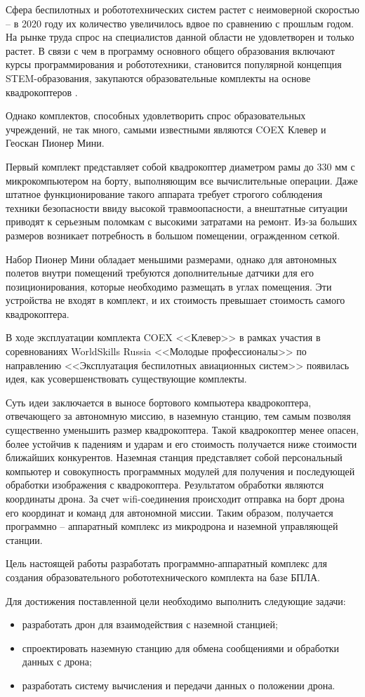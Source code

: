 Сфера беспилотных и робототехнических систем растет с неимоверной скоростью -- в 2020 году их количество увеличилось вдвое по сравнению с прошлым годом. На рынке труда спрос на специалистов данной области не удовлетворен и только растет. В связи с чем в программу основного общего образования включают курсы программирования и робототехники, становится популярной концепция STEM-образования, закупаются образовательные комплекты на основе квадрокоптеров \cite{minobr}.

Однако комплектов, способных удовлетворить спрос образовательных учреждений, не так много, самыми известными являются COEX Клевер и Геоскан Пионер Мини.

Первый комплект представляет собой квадрокоптер диаметром рамы до 330 мм с микрокомпьютером на борту, выполняющим все вычислительные операции. Даже штатное функционирование такого аппарата требует строгого соблюдения техники безопасности ввиду высокой травмоопасности, а внештатные ситуации приводят к серьезным поломкам с высокими затратами на ремонт. Из-за больших размеров возникает потребность в большом помещении, огражденном сеткой.

Набор Пионер Мини обладает меньшими размерами, однако для автономных полетов внутри помещений требуются дополнительные датчики для его позиционирования, которые необходимо размещать в углах помещения. Эти устройства не входят в комплект, и их стоимость превышает стоимость самого квадрокоптера.

В ходе эксплуатации комплекта COEX <<Клевер>> в рамках участия в соревнованиях WorldSkills Russia <<Молодые профессионалы>> по направлению <<Эксплуатация беспилотных авиационных систем>> появилась идея, как усовершенствовать существующие комплекты.

Суть идеи заключается в выносе бортового компьютера квадрокоптера, отвечающего за автономную миссию, в наземную станцию, тем самым позволяя существенно уменьшить размер квадрокоптера. Такой квадрокоптер менее опасен, более устойчив к падениям и ударам и его стоимость получается ниже стоимости ближайших конкурентов. Наземная станция представляет собой персональный компьютер и совокупность программных модулей для получения и последующей обработки изображения с квадрокоптера. Результатом обработки являются координаты дрона. За счет wifi-соединения происходит отправка на борт дрона его координат и команд для автономной миссии. Таким образом, получается программно -- аппаратный комплекс из микродрона и наземной управляющей станции.

Цель настоящей работы разработать программно-аппаратный комплекс для создания образовательного робототехнического комплекта на базе БПЛА.

Для достижения поставленной цели необходимо выполнить следующие задачи:
\begin{itemize}
	\item разработать дрон для взаимодействия с наземной станцией;
	\item спроектировать наземную станцию для обмена сообщениями и обработки данных с дрона;
	\item разработать систему вычисления и передачи данных о положении дрона. 
\end{itemize}